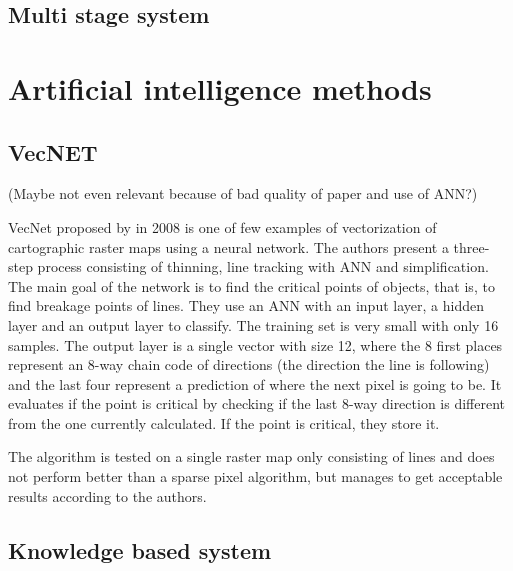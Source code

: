 \subsection{Multi stage system}
\cite{Oka2012}


\section{Artificial intelligence methods}

\subsection{VecNET}
(Maybe not even relevant because of bad quality of paper and use of ANN?)

VecNet proposed by \citeauthor{Karabork2008} in 2008 is one of few examples of vectorization of cartographic raster maps using a neural network. The authors present a three-step process consisting of thinning, line tracking with ANN and simplification. The main goal of the network is to find the critical points of objects, that is, to find breakage points of lines. They use an ANN with an input layer, a hidden layer and an output layer to classify. The training set is very small with only 16 samples. The output layer is a single vector with size 12, where the 8 first places represent an 8-way chain code of directions (the direction the line is following) and the last four represent a prediction of where the next pixel is going to be. It evaluates if the point is critical by checking if the last 8-way direction is different from the one currently calculated. If the point is critical, they store it.

The algorithm is tested on a single raster map only consisting of lines and does not perform better than a sparse pixel algorithm, but manages to get acceptable results according to the authors.

\subsection{Knowledge based system}
\cite{Lee2000}

\cite{Song2000}


